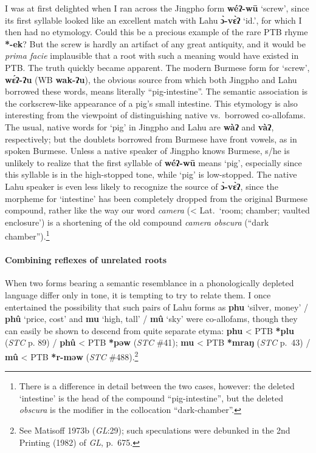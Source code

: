 I was at first delighted when I ran across the Jingpho form \textbf{wéʔ-wū} ‘screw’,
since its first syllable looked like an excellent match with Lahu \textbf{ɔ̀-vɛ̀ʔ} ‘id.’,
for which I then had no etymology. Could this be a precious example of the rare
PTB rhyme \textbf{*-ek}? But the screw is hardly an artifact of any great antiquity, and
it would be \textit{prima facie} implausible that a root with such a meaning would have
existed in PTB. The truth quickly became apparent. The modern Burmese form for
‘screw’, \textbf{wɛ́ʔ-ʔu} (WB \textbf{wak-ʔu}), the obvious source from which both Jingpho and
Lahu borrowed these words, means literally “pig-intestine”.  The semantic
association is the corkscrew-like appearance of a pig’s small intestine. This
etymology is also interesting from the viewpoint of distinguishing native vs.\
borrowed co-allofams. The usual, native words for ‘pig’ in Jingpho and Lahu are
\textbf{wàʔ} and \textbf{vàʔ}, respectively; but the doublets borrowed from Burmese have front
vowels, as in spoken Burmese. Unless a native speaker of Jingpho knows Burmese,
s/he is unlikely to realize that the first syllable of \textbf{wéʔ-wū} means ‘pig’,
especially since this syllable is in the high-stopped tone, while ‘pig’ is
low-stopped. The native Lahu speaker is even less likely to recognize the source
of \textbf{ɔ̀-vɛ̀ʔ}, since the morpheme for ‘intestine’ has been completely dropped from
the original Burmese compound, rather like the way our word \textit{camera} (< Lat.\
‘room; chamber; vaulted enclosure’) is a shortening of the old compound \textit{camera
obscura} (“dark chamber”).\footnote{There is a difference in detail between the
two cases, however: the deleted ‘intestine’ is the head of the compound
“pig-intestine”, but the deleted \textit{obscura} is the modifier in the collocation
“dark-chamber”.}

\paragraph{Combining reflexes of unrelated roots}

When two forms bearing a semantic resemblance in a phonologically depleted
language differ only in tone, it is tempting to try to relate them. I once
entertained the possibility that such pairs of Lahu forms as \textbf{phu} ‘silver, money’
/ \textbf{phû} ‘price, cost’ and \textbf{mu} ‘high, tall’ / \textbf{mû} ‘sky’ were co-allofams, though they
can easily be shown to descend from quite separate etyma: \textbf{phu} < PTB \textbf{*plu} (\textit{STC} p.
89) / \textbf{phû} < PTB \textbf{*pəw} (\textit{STC} \#41);
\textbf{mu} < PTB \textbf{*mraŋ} (\textit{STC} p.~43) / \textbf{mû} < PTB \textbf{*r-məw}
(\textit{STC} \#488).\footnote{See Matisoff 1973b (\textit{GL}:29); such speculations were debunked in
the 2nd Printing (1982) of \textit{GL}, p.~675.}

